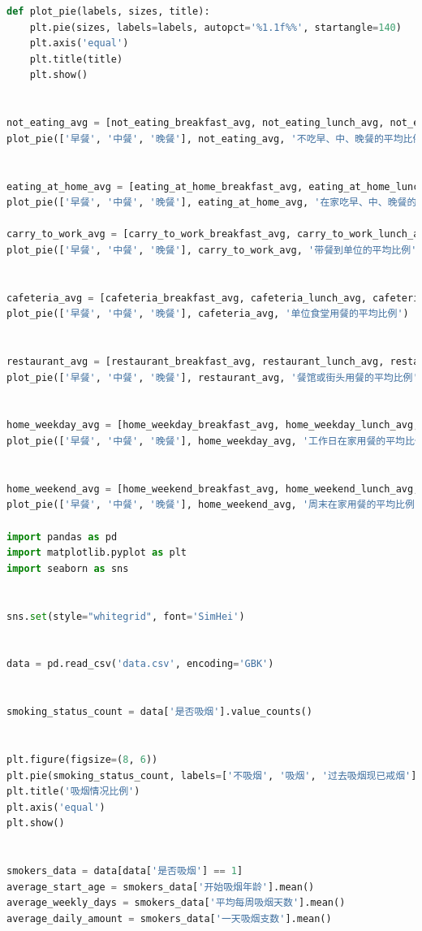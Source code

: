 \documentclass{cumcmthesis}
\begin{document}
\begin{appendices}
\begin{lstlisting}[language=python]
def plot_pie(labels, sizes, title):
    plt.pie(sizes, labels=labels, autopct='%1.1f%%', startangle=140)
    plt.axis('equal')
    plt.title(title)
    plt.show()


not_eating_avg = [not_eating_breakfast_avg, not_eating_lunch_avg, not_eating_dinner_avg]
plot_pie(['早餐', '中餐', '晚餐'], not_eating_avg, '不吃早、中、晚餐的平均比例')


eating_at_home_avg = [eating_at_home_breakfast_avg, eating_at_home_lunch_avg, eating_at_home_dinner_avg]
plot_pie(['早餐', '中餐', '晚餐'], eating_at_home_avg, '在家吃早、中、晚餐的平均比例')

carry_to_work_avg = [carry_to_work_breakfast_avg, carry_to_work_lunch_avg, carry_to_work_dinner_avg]
plot_pie(['早餐', '中餐', '晚餐'], carry_to_work_avg, '带餐到单位的平均比例')


cafeteria_avg = [cafeteria_breakfast_avg, cafeteria_lunch_avg, cafeteria_dinner_avg]
plot_pie(['早餐', '中餐', '晚餐'], cafeteria_avg, '单位食堂用餐的平均比例')


restaurant_avg = [restaurant_breakfast_avg, restaurant_lunch_avg, restaurant_dinner_avg]
plot_pie(['早餐', '中餐', '晚餐'], restaurant_avg, '餐馆或街头用餐的平均比例')


home_weekday_avg = [home_weekday_breakfast_avg, home_weekday_lunch_avg, home_weekday_dinner_avg]
plot_pie(['早餐', '中餐', '晚餐'], home_weekday_avg, '工作日在家用餐的平均比例')


home_weekend_avg = [home_weekend_breakfast_avg, home_weekend_lunch_avg, home_weekend_dinner_avg]
plot_pie(['早餐', '中餐', '晚餐'], home_weekend_avg, '周末在家用餐的平均比例')

import pandas as pd
import matplotlib.pyplot as plt
import seaborn as sns


sns.set(style="whitegrid", font='SimHei')


data = pd.read_csv('data.csv', encoding='GBK')


smoking_status_count = data['是否吸烟'].value_counts()


plt.figure(figsize=(8, 6))
plt.pie(smoking_status_count, labels=['不吸烟', '吸烟', '过去吸烟现已戒烟'], autopct='%1.1f%%', startangle=140, colors=sns.color_palette("pastel"))
plt.title('吸烟情况比例')
plt.axis('equal')
plt.show()


smokers_data = data[data['是否吸烟'] == 1]
average_start_age = smokers_data['开始吸烟年龄'].mean()
average_weekly_days = smokers_data['平均每周吸烟天数'].mean()
average_daily_amount = smokers_data['一天吸烟支数'].mean()



\end{lstlisting}
\end{appendices}
\end{document}

